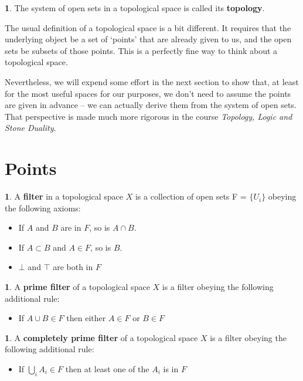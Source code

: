 \documentclass[oneside,english]{amsbook}
\numberwithin{section}{chapter}
\theoremstyle{plain}
\theoremstyle{definition}
\newtheorem{defn}[thm]{\protect\definitionname}
\providecommand{\definitionname}{Definition}
\begin{document}
\begin{defn} 
	The system of open sets in a topological space is called its \textbf{topology}.
\end{defn} 

The usual definition of a topological space is a bit different. It requires that the underlying object be a set of `points' that are already given to us, and the open sets be subsets of those points. This is a perfectly fine way to think about a topological space.

Nevertheless, we will expend some effort in the next section to show that, at least for the most useful spaces for our purposes, we don't need to assume the points are given in advance -- we can actually derive them from the system of open sets. That perspective is made much more rigorous in the course \textit{Topology, Logic and Stone Duality}.

\section{Points}

\begin{defn} 
	A \textbf{filter} in a topological space $X$ is a collection of open sets F = $\{U_i\}$ obeying the following axioms:
	\begin{itemize}
		\item If $A$ and $B$ are in $F$, so is $A\cap B$.
		\item If $A\subset B$ and $A\in F$, so is $B$.
		\item $\bot$ and $\top$ are both in $F$
	\end{itemize}
\end{defn} 

\begin{defn} 
	A \textbf{prime filter} of a topological space $X$ is a filter obeying the following additional rule:
	\begin{itemize}
		\item If $A\cup B\in F$ then either $A\in F$ or $B\in F$
	\end{itemize}
\end{defn} 

\begin{defn} 
	A \textbf{completely prime filter} of a topological space $X$ is a filter obeying the following additional rule:
	\begin{itemize}
		\item If $\bigcup_i A_i \in F$ then at least one of the $A_i$ is in $F$
	\end{itemize}
\end{defn} 
\end{document}
